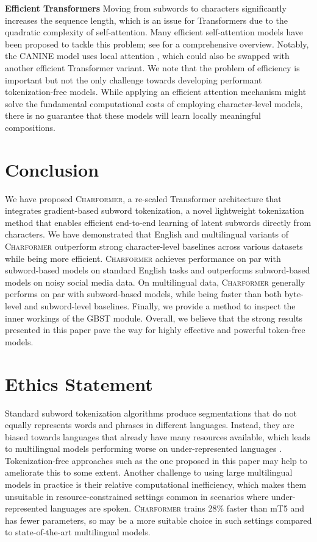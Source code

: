 \documentclass{article} \usepackage{iclr2022_conference,times}
\newcommand{\charformer}{\textsc{Charformer}\xspace}
\begin{document}
\noindent \textbf{Efficient Transformers} 
Moving from subwords to characters significantly increases the sequence length, which is an issue for Transformers due to the quadratic complexity of self-attention. Many efficient self-attention models have been proposed \citep{choromanski2020rethinking,wang2020linformer,zaheer2020big} to tackle this problem; see \citep{tay2020efficient,tay2020long} for a comprehensive overview. Notably, the CANINE model uses local attention \citep{parmar2018image}, which could also be swapped with another efficient Transformer variant. We note that the problem of efficiency is important but not the only challenge towards developing performant tokenization-free models. While applying an efficient attention mechanism might solve the fundamental computational costs of employing character-level models, there is no guarantee that these models will learn locally meaningful compositions.

\section{Conclusion}

We have proposed \charformer, a re-scaled Transformer architecture that integrates gradient-based subword tokenization, a novel lightweight tokenization method that enables efficient end-to-end learning of latent subwords directly from characters. We have demonstrated that English and multilingual variants of \charformer outperform strong character-level baselines across various datasets while being more efficient. \charformer achieves performance on par with subword-based models on standard English tasks and outperforms subword-based models on noisy social media data. On multilingual data, \charformer generally performs on par with subword-based models, while being faster than both byte-level and subword-level baselines. Finally, we provide a method to inspect the inner workings of the GBST module. Overall, we believe that the strong results presented in this paper pave the way for highly effective and powerful token-free models.

\section*{Ethics Statement}



Standard subword tokenization algorithms produce segmentations that do not equally represents words and phrases in different languages. Instead, they are biased towards languages that already have many resources available, which leads to multilingual models performing worse on under-represented languages \citep{Wang2021multi-view}. Tokenization-free approaches such as the one proposed in this paper may help to ameliorate this to some extent. Another challenge to using large multilingual models in practice is their relative computational inefficiency, which makes them unsuitable in resource-constrained settings common in scenarios where under-represented languages are spoken. \charformer trains 28\% faster than mT5 and has  fewer parameters, so may be a more suitable choice in such settings compared to state-of-the-art multilingual models.
\end{document}
